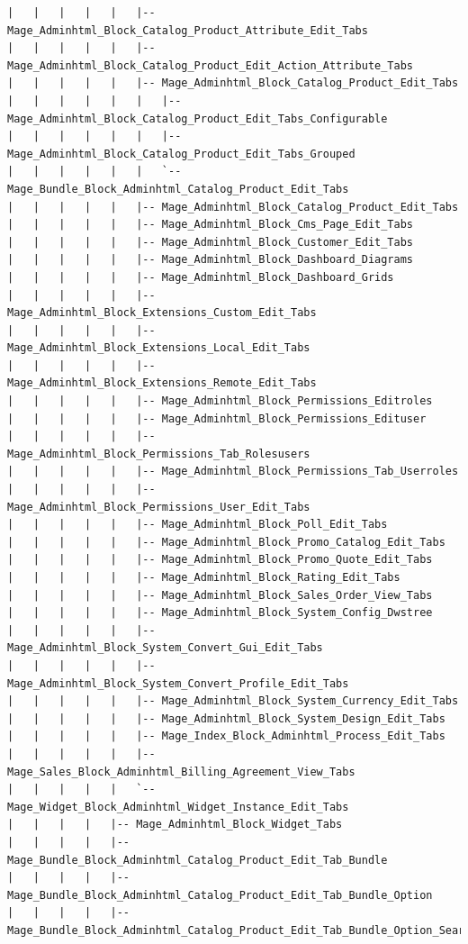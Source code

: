 \documentclass[oneside]{book}
\begin{document}
\begin{lstlisting}
|   |   |   |   |   |-- Mage_Adminhtml_Block_Catalog_Product_Attribute_Edit_Tabs
|   |   |   |   |   |-- Mage_Adminhtml_Block_Catalog_Product_Edit_Action_Attribute_Tabs
|   |   |   |   |   |-- Mage_Adminhtml_Block_Catalog_Product_Edit_Tabs
|   |   |   |   |   |   |-- Mage_Adminhtml_Block_Catalog_Product_Edit_Tabs_Configurable
|   |   |   |   |   |   |-- Mage_Adminhtml_Block_Catalog_Product_Edit_Tabs_Grouped
|   |   |   |   |   |   `-- Mage_Bundle_Block_Adminhtml_Catalog_Product_Edit_Tabs
|   |   |   |   |   |-- Mage_Adminhtml_Block_Catalog_Product_Edit_Tabs
|   |   |   |   |   |-- Mage_Adminhtml_Block_Cms_Page_Edit_Tabs
|   |   |   |   |   |-- Mage_Adminhtml_Block_Customer_Edit_Tabs
|   |   |   |   |   |-- Mage_Adminhtml_Block_Dashboard_Diagrams
|   |   |   |   |   |-- Mage_Adminhtml_Block_Dashboard_Grids
|   |   |   |   |   |-- Mage_Adminhtml_Block_Extensions_Custom_Edit_Tabs
|   |   |   |   |   |-- Mage_Adminhtml_Block_Extensions_Local_Edit_Tabs
|   |   |   |   |   |-- Mage_Adminhtml_Block_Extensions_Remote_Edit_Tabs
|   |   |   |   |   |-- Mage_Adminhtml_Block_Permissions_Editroles
|   |   |   |   |   |-- Mage_Adminhtml_Block_Permissions_Edituser
|   |   |   |   |   |-- Mage_Adminhtml_Block_Permissions_Tab_Rolesusers
|   |   |   |   |   |-- Mage_Adminhtml_Block_Permissions_Tab_Userroles
|   |   |   |   |   |-- Mage_Adminhtml_Block_Permissions_User_Edit_Tabs
|   |   |   |   |   |-- Mage_Adminhtml_Block_Poll_Edit_Tabs
|   |   |   |   |   |-- Mage_Adminhtml_Block_Promo_Catalog_Edit_Tabs
|   |   |   |   |   |-- Mage_Adminhtml_Block_Promo_Quote_Edit_Tabs
|   |   |   |   |   |-- Mage_Adminhtml_Block_Rating_Edit_Tabs
|   |   |   |   |   |-- Mage_Adminhtml_Block_Sales_Order_View_Tabs
|   |   |   |   |   |-- Mage_Adminhtml_Block_System_Config_Dwstree
|   |   |   |   |   |-- Mage_Adminhtml_Block_System_Convert_Gui_Edit_Tabs
|   |   |   |   |   |-- Mage_Adminhtml_Block_System_Convert_Profile_Edit_Tabs
|   |   |   |   |   |-- Mage_Adminhtml_Block_System_Currency_Edit_Tabs
|   |   |   |   |   |-- Mage_Adminhtml_Block_System_Design_Edit_Tabs
|   |   |   |   |   |-- Mage_Index_Block_Adminhtml_Process_Edit_Tabs
|   |   |   |   |   |-- Mage_Sales_Block_Adminhtml_Billing_Agreement_View_Tabs
|   |   |   |   |   `-- Mage_Widget_Block_Adminhtml_Widget_Instance_Edit_Tabs
|   |   |   |   |-- Mage_Adminhtml_Block_Widget_Tabs
|   |   |   |   |-- Mage_Bundle_Block_Adminhtml_Catalog_Product_Edit_Tab_Bundle
|   |   |   |   |-- Mage_Bundle_Block_Adminhtml_Catalog_Product_Edit_Tab_Bundle_Option
|   |   |   |   |-- Mage_Bundle_Block_Adminhtml_Catalog_Product_Edit_Tab_Bundle_Option_Search

\end{lstlisting}
\end{document}
